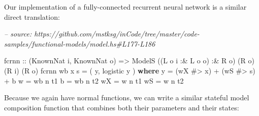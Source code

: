\documentclass[]{article}
\newenvironment{Shaded}{}{}
\newcommand{\CommentTok}[1]{\textcolor[rgb]{0.38,0.63,0.69}{\textit{#1}}}
\newcommand{\DataTypeTok}[1]{\textcolor[rgb]{0.56,0.13,0.00}{#1}}
\newcommand{\FunctionTok}[1]{\textcolor[rgb]{0.02,0.16,0.49}{#1}}
\newcommand{\KeywordTok}[1]{\textcolor[rgb]{0.00,0.44,0.13}{\textbf{#1}}}
\newcommand{\NormalTok}[1]{#1}
\newcommand{\OtherTok}[1]{\textcolor[rgb]{0.00,0.44,0.13}{#1}}
\begin{document}
Our implementation of a fully-connected recurrent neural network is a similar
direct translation:

\begin{Shaded}
\begin{Highlighting}[]
\CommentTok{-- source: https://github.com/mstksg/inCode/tree/master/code-samples/functional-models/model.hs#L177-L186}

\NormalTok{fcrnn}
\OtherTok{    ::}\NormalTok{ (}\DataTypeTok{KnownNat}\NormalTok{ i, }\DataTypeTok{KnownNat}\NormalTok{ o)}
    \OtherTok{=>} \DataTypeTok{ModelS}\NormalTok{ ((}\DataTypeTok{L}\NormalTok{ o i }\FunctionTok{:&} \DataTypeTok{L}\NormalTok{ o o) }\FunctionTok{:&} \DataTypeTok{R}\NormalTok{ o) (}\DataTypeTok{R}\NormalTok{ o) (}\DataTypeTok{R}\NormalTok{ i) (}\DataTypeTok{R}\NormalTok{ o)}
\NormalTok{fcrnn wb x s }\FunctionTok{=}\NormalTok{ ( y, logistic y )}
  \KeywordTok{where}
\NormalTok{    y  }\FunctionTok{=}\NormalTok{ (wX }\FunctionTok{#>}\NormalTok{ x) }\FunctionTok{+}\NormalTok{ (wS }\FunctionTok{#>}\NormalTok{ s) }\FunctionTok{+}\NormalTok{ b}
\NormalTok{    w  }\FunctionTok{=}\NormalTok{ wb }\FunctionTok{^^.}\NormalTok{ t1}
\NormalTok{    b  }\FunctionTok{=}\NormalTok{ wb }\FunctionTok{^^.}\NormalTok{ t2}
\NormalTok{    wX }\FunctionTok{=}\NormalTok{ w  }\FunctionTok{^^.}\NormalTok{ t1}
\NormalTok{    wS }\FunctionTok{=}\NormalTok{ w  }\FunctionTok{^^.}\NormalTok{ t2}
\end{Highlighting}
\end{Shaded}

Because we again have normal functions, we can write a similar stateful model
composition function that combines both their parameters and their states:
\end{document}
